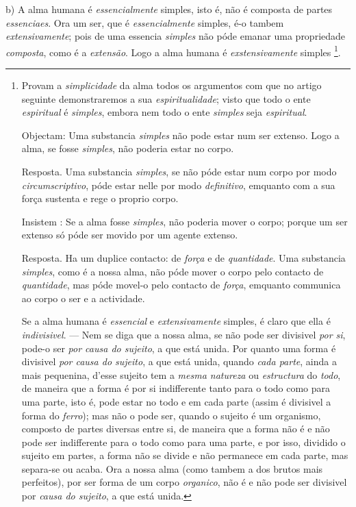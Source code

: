 b) A alma humana é \emph{essencialmente} simples, isto é, não é composta de partes \emph{essenciaes}. Ora um ser, que é \emph{essencialmente} simples, é-o tambem \emph{extensivamente}; pois de uma essencia \emph{simples} não póde emanar uma propriedade \emph{composta}, como é a \emph{extensão}. Logo a alma humana é \emph{exstensivamente} simples \footnote{Provam a \emph{simplicidade} da alma todos os argumentos com que no artigo seguinte demonstraremos a sua \emph{espiritualidade}; visto que todo o ente \emph{espiritual} é \emph{simples}, embora nem todo o ente \emph{simples} seja \emph{espiritual}.\par Objectam: Uma substancia \emph{simples} não pode estar num ser extenso. Logo a alma, se fosse \emph{simples}, não poderia estar no corpo.\par Resposta. Uma substancia \emph{simples}, se não póde estar num corpo por modo \emph{circumscriptivo}, póde estar nelle por modo \emph{definitivo}, emquanto com a sua força sustenta e rege o proprio corpo.\par Insistem : Se a alma fosse \emph{simples}, não poderia mover o corpo; porque um ser extenso só póde ser movido por um agente extenso.\par Resposta. Ha um duplice contacto: de \emph{força} e de \emph{quantidade}. Uma substancia \emph{simples}, como é a nossa alma, não póde mover o corpo pelo contacto de \emph{quantidade}, mas póde movel-o pelo contacto de \emph{força}, emquanto communica ao corpo o ser e a actividade.\par Se a alma humana é \emph{essencial} e \emph{extensivamente} simples, é claro que ella é \emph{indivisivel}. --- Nem se diga que a nossa alma, se não pode ser divisivel \emph{por si}, pode-o ser \emph{por causa do sujeito}, a que está unida. Por quanto uma forma é divisivel \emph{por causa do sujeito}, a que está unida, quando \emph{cada parte}, ainda a mais pequenina, d'esse sujeito tem a \emph{mesma natureza} ou \emph{estructura} do \emph{todo}, de maneira que a forma é por si indifferente tanto para o todo como para uma parte, isto é, pode estar no todo e em cada parte (assim é divisivel a forma do \emph{ferro}); mas não o pode ser, quando o sujeito é um organismo, composto de partes diversas entre si, de maneira que a forma não é e não pode ser indifferente para o todo como para uma parte, e por isso, dividido o sujeito em partes, a forma não se divide e não permanece em cada parte, mas separa-se ou acaba. Ora a nossa alma (como tambem a dos brutos mais perfeitos), por ser forma de um corpo \emph{organico}, não é e não pode ser divisivel por \emph{causa do sujeito}, a que está unida.}.

